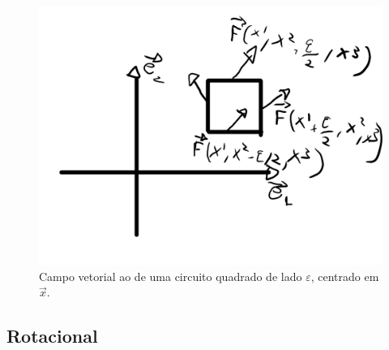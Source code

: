 \begin{figure}
	\centering \includegraphics[scale=0.5]{Rot.pdf}
	\caption{Campo vetorial ao de uma circuito quadrado de lado $\varepsilon$,
		centrado em $\vec{x}$.\label{fig:rot}}
\end{figure}

\subsection{Rotacional}
\label{sec:rot}

